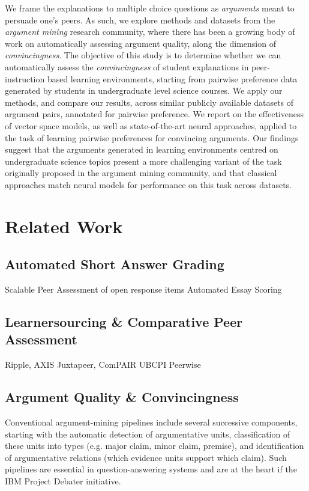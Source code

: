 \documentclass[runningheads]{llncs}
\begin{document}
We frame the explanations to multiple choice questions as \textit{arguments} 
meant to persuade one's peers. As such, we explore methods and datasets from 
the \textit{argument mining} research community, where there has been a growing 
body of work on automatically assessing argument quality, along the dimension 
of \textit{convincingness}.
The objective of this study is to determine whether we can automatically assess 
the \textit{convincingness} of student explanations in peer-instruction based 
learning environments, starting from pairwise preference data generated by 
students in undergraduate level science courses. We apply our methods, and 
compare our results, across similar publicly available datasets of argument 
pairs, annotated for pairwise preference. We report on the effectiveness of 
vector space models, as well as state-of-the-art neural approaches, applied to 
the task of learning pairwise preferences for convincing arguments. Our 
findings suggest that the arguments generated in learning environments centred 
on undergraduate science topics present a more challenging variant of the task 
originally proposed in the argument mining community, and that classical 
approaches match neural models for performance on this task across datasets.

\section{Related Work}

\subsection{Automated Short Answer Grading}
Scalable Peer Assessment of open response items\cite{piech_tuned_2013}
Automated Essay Scoring\cite{shermis_automated_2003}


\subsection{Learnersourcing \& Comparative Peer Assessment}
Ripple\cite{khosravi_ripple_2019}, 
AXIS\cite{williams_axis:_2016}
Juxtapeer\cite{cambre_juxtapeer:_2018}, 
ComPAIR\cite{potter_compair:_2017}
UBCPI\cite{univeristy_of_british_columbia_ubc/ubcpi_2019}
Peerwise\cite{denny_peerwise:_2008}

\subsection{Argument Quality \& Convincingness}
Conventional argument-mining pipelines include several successive components, 
starting with the automatic detection of argumentative units, classification of 
these units into types (e.g. major claim, minor claim, premise), and 
identification of argumentative relations (which evidence units support which 
claim). 
Such pipelines are essential in question-answering systems 
\cite{lippi_argumentation_2016} and are at the heart if the IBM Project Debater 
initiative. 
\end{document}
